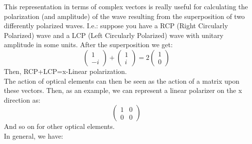 \documentclass[../electromagnetism.tex]{subfiles}
\begin{document}
This representation in terms of complex vectors is really useful for calculating the polarization (and amplitude) of the wave resulting from the superposition of two differently polarized waves.
I.e.: suppose you have a RCP (Right Circularly Polarized) wave and a LCP (Left Circularly Polarized) wave with unitary amplitude in some units. After the superposition we get:
\begin{equation*}
	\begin{pmatrix}
		1\\-i
	\end{pmatrix}+\begin{pmatrix}
		1\\i
	\end{pmatrix}=2\begin{pmatrix}
		1\\0
	\end{pmatrix}
\end{equation*}
Then, RCP+LCP=x-Linear polarization.\\
The action of optical elements can then be seen as the action of a matrix upon these vectors. Then, as an example, we can represent a linear polarizer on the x direction as:
\begin{equation}
	\begin{pmatrix}
		1&0\\0&0
	\end{pmatrix}
	\label{eq:xpolarizerjones}
\end{equation}
And so on for other optical elements.\\
In general, we have:
\end{document}
